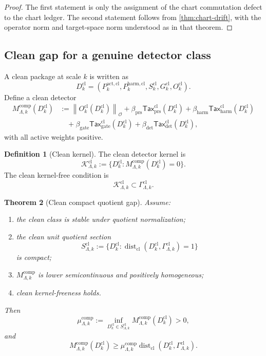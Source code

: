 \documentclass[11pt]{article}
\numberwithin{equation}{section}
\theoremstyle{plain}
\newtheorem{theorem}{Theorem}[section]
\theoremstyle{definition}
\newtheorem{definition}[theorem]{Definition}
\theoremstyle{remark}
\newcommand{\cl}{\mathrm{cl}}
\newcommand{\comp}{\mathrm{comp}}
\newcommand{\prs}{\mathrm{prs}}
\newcommand{\harm}{\mathrm{harm}}
\newcommand{\gate}{\mathrm{gate}}
\newcommand{\detc}{\mathrm{det}}
\newcommand{\Tax}{\mathsf{Tax}}
\newcommand{\Dist}{\operatorname{dist}}
\newcommand{\K}{\mathcal K}
\newcommand{\norm}[1]{\left\lVert #1\right\rVert}
\begin{document}
\begin{proof}
The first statement is only the assignment of the chart commutation defect to
the chart ledger.  The second statement follows from
\cref{thm:chart-drift}, with the operator norm and target-space norm
understood as in that theorem.
\end{proof}

\subsection{Clean gap for a genuine detector class}

A clean package at scale \(k\) is written as
\[
  D_k^{\cl}=(P_k^{\mathrm{act},\cl},P_k^{\harm,\cl},
  S_k^{\cl},G_k^{\cl},O_k^{\cl}).
\]
Define a clean detector
\begin{align*}
  M_{\Lambda,k}^{\comp}(D_k^{\cl})
  &:=
  \norm{O_k^{\cl}(D_k^{\cl})}_{\mathcal O}
  +\beta_{\prs}\Tax_{\prs}^{\cl}(D_k^{\cl})
  +\beta_{\harm}\Tax_{\harm}^{\cl}(D_k^{\cl})\\
  &\quad
  +\beta_{\gate}\Tax_{\gate}^{\cl}(D_k^{\cl})
  +\beta_{\detc}\Tax_{\detc}^{\cl}(D_k^{\cl}),
\end{align*}
with all active weights positive.

\begin{definition}[Clean kernel]\label{def:clean-kernel}
The clean detector kernel is
\[
  \K_{\Lambda,k}^{\cl}
  :=
  \{D_k^{\cl}:M_{\Lambda,k}^{\comp}(D_k^{\cl})=0\}.
\]
The clean kernel-free condition is
\[
  \K_{\Lambda,k}^{\cl}\subset\Gamma_{\Lambda,k}^{\cl}.
\]
\end{definition}

\begin{theorem}[Clean compact quotient gap]\label{thm:clean-gap}
Assume:
\begin{enumerate}[label=(\alph*)]
  \item the clean class is stable under quotient normalization;
  \item the clean unit quotient section
  \[
    S_{\Lambda,k}^{\cl}
    :=
    \{D_k^{\cl}:\Dist_{\cl}(D_k^{\cl},\Gamma_{\Lambda,k}^{\cl})=1\}
  \]
  is compact;
  \item \(M_{\Lambda,k}^{\comp}\) is lower semicontinuous and positively
  homogeneous;
  \item clean kernel-freeness holds.
\end{enumerate}
Then
\[
  \mu_{\Lambda,k}^{\comp}
  :=
  \inf_{D_k^{\cl}\in S_{\Lambda,k}^{\cl}}
  M_{\Lambda,k}^{\comp}(D_k^{\cl})>0,
\]
and
\[
  M_{\Lambda,k}^{\comp}(D_k^{\cl})
  \ge
  \mu_{\Lambda,k}^{\comp}
  \Dist_{\cl}(D_k^{\cl},\Gamma_{\Lambda,k}^{\cl}).
\]
\end{theorem}
\end{document}
